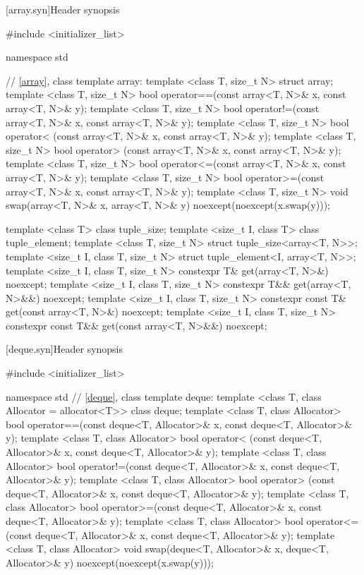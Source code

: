 [array.syn]{Header  synopsis}

%
\begin{codeblock}
#include <initializer_list>

namespace std {
  // \ref{array}, class template array:
  template <class T, size_t N> struct array;
  template <class T, size_t N>
    bool operator==(const array<T, N>& x, const array<T, N>& y);
  template <class T, size_t N>
    bool operator!=(const array<T, N>& x, const array<T, N>& y);
  template <class T, size_t N>
    bool operator< (const array<T, N>& x, const array<T, N>& y);
  template <class T, size_t N>
    bool operator> (const array<T, N>& x, const array<T, N>& y);
  template <class T, size_t N>
    bool operator<=(const array<T, N>& x, const array<T, N>& y);
  template <class T, size_t N>
    bool operator>=(const array<T, N>& x, const array<T, N>& y);
  template <class T, size_t N>
    void swap(array<T, N>& x, array<T, N>& y) noexcept(noexcept(x.swap(y)));

  template <class T> class tuple_size;
  template <size_t I, class T> class tuple_element;
  template <class T, size_t N>
    struct tuple_size<array<T, N>>;
  template <size_t I, class T, size_t N>
    struct tuple_element<I, array<T, N>>;
  template <size_t I, class T, size_t N>
    constexpr T& get(array<T, N>&) noexcept;
  template <size_t I, class T, size_t N>
    constexpr T&& get(array<T, N>&&) noexcept;
  template <size_t I, class T, size_t N>
    constexpr const T& get(const array<T, N>&) noexcept;
  template <size_t I, class T, size_t N>
    constexpr const T&& get(const array<T, N>&&) noexcept;
}
\end{codeblock}

[deque.syn]{Header  synopsis}


\begin{codeblock}
#include <initializer_list>

namespace std {
  // \ref{deque}, class template deque:
  template <class T, class Allocator = allocator<T>> class deque;
  template <class T, class Allocator>
    bool operator==(const deque<T, Allocator>& x, const deque<T, Allocator>& y);
  template <class T, class Allocator>
    bool operator< (const deque<T, Allocator>& x, const deque<T, Allocator>& y);
  template <class T, class Allocator>
    bool operator!=(const deque<T, Allocator>& x, const deque<T, Allocator>& y);
  template <class T, class Allocator>
    bool operator> (const deque<T, Allocator>& x, const deque<T, Allocator>& y);
  template <class T, class Allocator>
    bool operator>=(const deque<T, Allocator>& x, const deque<T, Allocator>& y);
  template <class T, class Allocator>
    bool operator<=(const deque<T, Allocator>& x, const deque<T, Allocator>& y);
  template <class T, class Allocator>
    void swap(deque<T, Allocator>& x, deque<T, Allocator>& y)
      noexcept(noexcept(x.swap(y)));
}
\end{codeblock}

